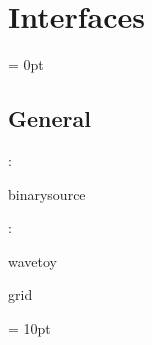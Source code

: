 
\section{Interfaces} 


\parskip = 0pt

\vspace{3mm} \subsection*{General}

: 

binarysource
\vspace{2mm}

: 

wavetoy

grid
\vspace{2mm}

\vspace{5mm}\parskip = 10pt 
